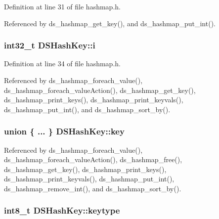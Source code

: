 Definition at line 31 of file hashmap.\+h.



Referenced by ds\+\_\+hashmap\+\_\+get\+\_\+key(), and ds\+\_\+hashmap\+\_\+put\+\_\+int().

\subsubsection[{\texorpdfstring{i}{i}}]{\setlength{\rightskip}{0pt plus 5cm}int32\+\_\+t D\+S\+Hash\+Key\+::i}\hypertarget{structDSHashKey_a720d0e6642cda5e1dcb69fc6fbc39597}{}\label{structDSHashKey_a720d0e6642cda5e1dcb69fc6fbc39597}


Definition at line 34 of file hashmap.\+h.



Referenced by ds\+\_\+hashmap\+\_\+foreach\+\_\+value(), ds\+\_\+hashmap\+\_\+foreach\+\_\+value\+Action(), ds\+\_\+hashmap\+\_\+get\+\_\+key(), ds\+\_\+hashmap\+\_\+print\+\_\+keys(), ds\+\_\+hashmap\+\_\+print\+\_\+keyvals(), ds\+\_\+hashmap\+\_\+put\+\_\+int(), and ds\+\_\+hashmap\+\_\+sort\+\_\+by().

\subsubsection[{\texorpdfstring{key}{key}}]{\setlength{\rightskip}{0pt plus 5cm}union \{ ... \}   D\+S\+Hash\+Key\+::key}\hypertarget{structDSHashKey_ad2ed83c36c76bc722abd06aacce6c688}{}\label{structDSHashKey_ad2ed83c36c76bc722abd06aacce6c688}


Referenced by ds\+\_\+hashmap\+\_\+foreach\+\_\+value(), ds\+\_\+hashmap\+\_\+foreach\+\_\+value\+Action(), ds\+\_\+hashmap\+\_\+free(), ds\+\_\+hashmap\+\_\+get\+\_\+key(), ds\+\_\+hashmap\+\_\+print\+\_\+keys(), ds\+\_\+hashmap\+\_\+print\+\_\+keyvals(), ds\+\_\+hashmap\+\_\+put\+\_\+int(), ds\+\_\+hashmap\+\_\+remove\+\_\+int(), and ds\+\_\+hashmap\+\_\+sort\+\_\+by().

\subsubsection[{\texorpdfstring{keytype}{keytype}}]{\setlength{\rightskip}{0pt plus 5cm}int8\+\_\+t D\+S\+Hash\+Key\+::keytype}\hypertarget{structDSHashKey_a8178bcd0186d5c07c686578355fc86db}{}\label{structDSHashKey_a8178bcd0186d5c07c686578355fc86db}



